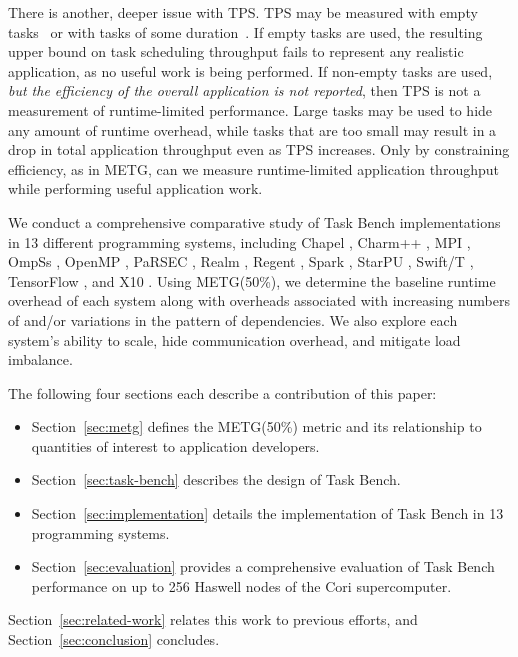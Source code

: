 There is another, deeper issue with TPS. TPS may be measured with
empty tasks~\cite{LegionTracing18} or with tasks of some
duration~\cite{Canary16, Armstrong14}. If empty tasks are used, the
resulting upper bound on task scheduling throughput fails to represent
any realistic application, as no
useful work is being performed. If non-empty tasks are used, \emph{but
  the efficiency of the overall application is not reported}, then TPS
is not a measurement of runtime-limited performance. Large tasks may
be used to hide any amount of runtime overhead,
while tasks that are too small may result in a drop in total
application throughput even as TPS increases. Only by constraining
efficiency, as in METG, can we measure runtime-limited application
throughput while performing useful application work.

We conduct a comprehensive comparative study of Task Bench
implementations in 13 different programming systems, including
Chapel \cite{Chapel07}, Charm++ \cite{Charmpp93}, MPI \cite{MPI},
OmpSs \cite{OmpSs11}, OpenMP \cite{OpenMPSpec40},
PaRSEC \cite{PARSEC13}, Realm \cite{Realm14}, Regent \cite{Regent15},
Spark \cite{Spark10}, StarPU \cite{StarPU11},
Swift/T \cite{Wozniak13}, TensorFlow \cite{TensorFlow15}, and
X10 \cite{X1005}. Using METG(50\%), we determine the baseline
runtime overhead of each system along with overheads associated with
increasing numbers of and/or variations in the pattern of dependencies. We
also explore each system's ability to scale, hide communication
overhead, and mitigate load imbalance.

The following four sections each describe a contribution of this
paper:

\begin{itemize}
\item Section~\ref{sec:metg} defines the METG(50\%) metric and its
  relationship to quantities of interest to application developers.
\item Section~\ref{sec:task-bench} describes the design of Task Bench.
\item Section~\ref{sec:implementation} details the implementation of
  Task Bench in 13 programming systems.
\item Section~\ref{sec:evaluation} provides a comprehensive evaluation
  of Task Bench performance on up to 256 Haswell nodes of the Cori
  supercomputer.
\end{itemize}

Section~\ref{sec:related-work} relates this work to previous efforts,
and Section~\ref{sec:conclusion} concludes.
